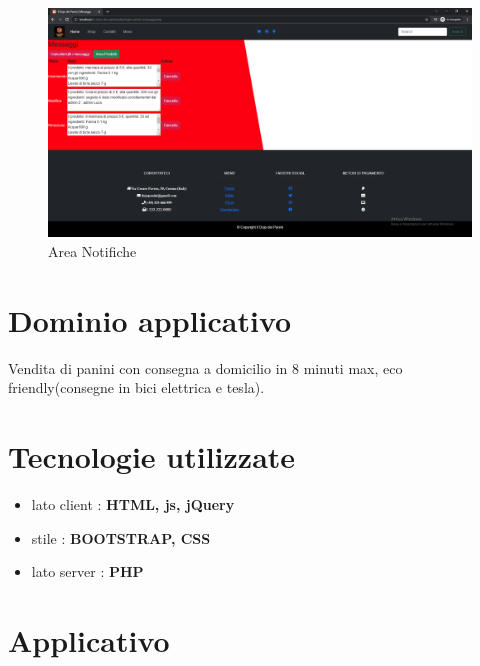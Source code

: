 \documentclass[a4paper,12pt]{report}
\begin{document}
	\begin{figure}[H] 
		\centering
		\includegraphics[width=1.2\textwidth, height=1.2\textheight, keepaspectratio]{./Images/Admin_area_notifiche.png}
		\caption{Area Notifiche}
		\label{fig:notifiche}
	\end{figure}
	
	
	\newpage
	
	\section{Dominio applicativo}
	Vendita di panini con consegna a domicilio in 8 minuti max, eco friendly(consegne in bici elettrica e tesla).
	
	\section{Tecnologie utilizzate}
	\begin{itemize}
		\item lato client : \textbf{HTML, js, jQuery}
		\item stile : \textbf{BOOTSTRAP, CSS}
		\item lato server : \textbf{PHP}
	\end{itemize}

	\section{Applicativo}
	
\end{document}
